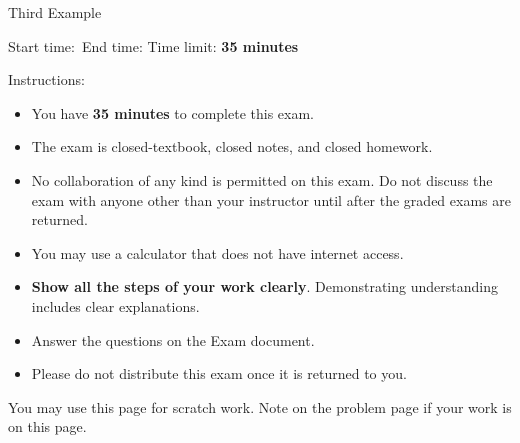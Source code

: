 \documentclass[main.tex,14pt]{subfiles}
\begin{document}
\setcounter{page}{0}
\thispagestyle{empty}

{\Large Third Example}%

{Start time:\hrulefill\ End time: \hrulefill}
Time limit: \textbf{35 minutes}
\ifprintanswers
\else %

\vspace{1cm}
{\Large Instructions:}
\begin{itemize}

 \item You have \textbf{35 minutes} to complete this exam.

 \item The exam is closed-textbook, closed notes, and closed homework. 
 
 \item No collaboration of any kind is permitted on this exam. Do not discuss the exam with anyone other than your instructor until after the graded exams are returned.
 
 \item You may use a calculator that does not have internet access. 

 \item \textbf{Show all the steps of your work clearly}. Demonstrating understanding includes clear explanations.
 
\item Answer the questions on the Exam document. 


\item Please do not distribute this exam once it is returned to you.



 \end{itemize}


\afterpage{\blankpage}

\clearpage
\fi


\ifprintanswers
\else %

You may use this page for scratch work. Note on the problem page if your work is on this page.
\thispagestyle{empty}
\hbox{}


\checkoddpage{}
\fi
\end{document}
